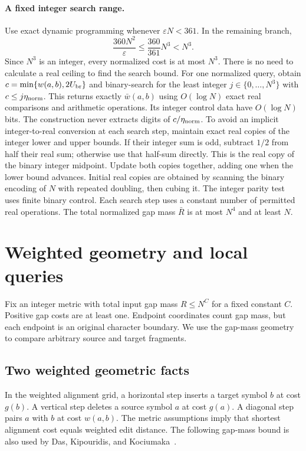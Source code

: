 \documentclass[11pt]{article}
\theoremstyle{definition}
\newcommand{\eps}{\varepsilon}
\newcommand{\1}{\mathbf 1}
\begin{document}
\paragraph{A fixed integer search range.}
Use exact dynamic programming whenever $\eps N<361$. In the remaining
branch,
\[
\frac{360N^2}{\eps}\le\frac{360}{361}N^3<N^3.
\]
Since $N^3$ is an integer, every normalized cost is at most $N^3$.
There is no need to calculate a real ceiling to find the search bound.
For one normalized query, obtain $c=\min\{w(a,b),2U_{\rm br}\}$ and binary-search
for the least integer $j\in\{0,\ldots,N^3\}$ with $c\le j\eta_{\rm norm}$.
This returns exactly $\bar w(a,b)$ using $O(\log N)$ exact real
comparisons and arithmetic operations. Its integer control data have
$O(\log N)$ bits. The construction never extracts digits of $c/\eta_{\rm norm}$.
To avoid an implicit integer-to-real conversion at each search step,
maintain exact real copies of the integer lower and upper bounds.
If their integer sum is odd, subtract $1/2$ from half their real sum;
otherwise use that half-sum directly. This is the real copy of the
binary integer midpoint. Update both copies together, adding one when
the lower bound advances. Initial real copies are obtained by scanning
the binary encoding of $N$ with repeated doubling, then cubing it.
The integer parity test uses finite binary control.
Each search step uses a constant number of permitted real operations.
The total normalized gap mass $\bar R$ is at most $N^4$ and at least $N$.


\section{Weighted geometry and local queries}\label{paper:sec:geometry}

Fix an integer metric with total input gap mass $R\le N^C$ for a fixed
constant $C$. Positive gap costs are at least one.
Endpoint coordinates count gap mass, but each endpoint is an original
character boundary. We use the gap-mass geometry to compare arbitrary
source and target fragments.

\FloatBarrier

\subsection{Two weighted geometric facts}

In the weighted alignment grid, a horizontal step inserts a target
symbol $b$ at cost $g(b)$. A vertical step deletes a source symbol $a$
at cost $g(a)$. A diagonal step pairs $a$ with $b$ at cost $w(a,b)$.
The metric assumptions imply that shortest alignment cost equals weighted
edit distance. The following gap-mass bound is also used by
Das, Kipouridis, and Kociumaka~\cite{dkk}.
\end{document}
